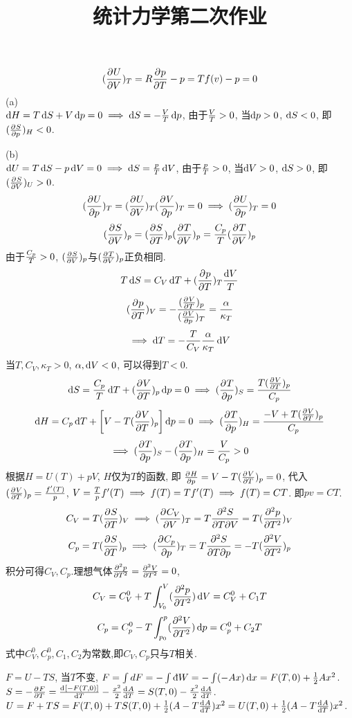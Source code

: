 \documentclass[UTF8,9pt]{ctexart}
\title{统计力学第二次作业}
\begin{document}
 
\maketitle
{}
$$(\pp{U}{V})_T=R\pp{p}{T}-p=Tf(v)-p=0$$
\qqed
{}
    (a)\\
$\d H=T\d S+V\d p=0 \ip \d S=-\f{V}{T}\d p$, 由于$\f{V}{T}>0$, 当$\d p>0$, $\d S<0$, 即$(\pp{S}{p})_H<0$.  

    (b)\\
$\d U =T\d S-p\d V=0 \ip \d S=\f{p}{T}\d V$, 由于$\f{p}{T}>0$, 当$\d V>0$, $\d S>0$, 即$(\pp{S}{V})_U>0$.
\qqed
{}
 $$(\pp{U}{p})_T=(\pp{U}{V})_T(\pp{V}{p})_T=0 \ip (\pp{U}{p})_T=0$$
\qqed
{}
$$(\pp{S}{V})_p=(\pp{S}{T})_p(\pp{T}{V})_p=\f{C_p}{T}(\pp{T}{V})_p$$
由于$\f{C_p}{T}>0$, $(\pp{S}{V})_p$与$(\pp{T}{V})_p$正负相同.
\qqed
{}
$$T\d S = C_V\d T+(\pp{p}{T})_T\f{\d V}{T}$$
$$(\pp{p}{T})_V=-\f{(\pp{V}{T})_p}{(\pp{V}{p})_T} = \f{\a}{\kappa_T}$$
$$\ip \d T= -\f{T}{C_V}\f{\a}{\kappa_T}\d V$$
当$T,C_V,\kappa_T>0$, $\a,\d V<0$, 可以得到$T<0$.
\qqed
{}
$$\d S  =\f{C_p}{T}\d T+(\pp{V}{T})_p\d p=0 \ip (\pp{T}{p})_S=\f{T(\pp{V}{T})_p}{C_p}$$
$$\d H =C_p\d T+\left[V-T(\pp{V}{T})_p\right]\d p=0 \ip (\pp{T}{p})_H=\f{-V+T(\pp{V}{T})_p}{C_p}$$
$$\ip (\pp{T}{p})_S-(\pp{T}{p})_H = \f{V}{C_p}>0$$
\qqed
{}
根据$H=U(T)+pV$, $H$仅为$T$的函数, 即 $\pp{H}{p}=V-T(\pp{V}{T})_p=0 $, 代入$(\pp{V}{T})_p=\f{f'(T)}{p}$, $V=\f{T}{p}f'(T) \ip f(T)=Tf'(T) \ip f(T)=CT$. 即$pv=CT$.
$$C_V=T(\pp{S}{T})_V \ip (\pp{C_V}{V})_T = T\f{\partial^2 S}{\partial T\partial V}=T(\pp[2]{ p}{T})_V$$
$$C_p=T(\pp{S}{T})_p \ip (\pp{C_p}{p})_T=T\f{\partial^2 S}{\partial T\partial p} = -T(\pp[2]{V}{T})_p$$
积分可得$C_V,C_p$.理想气体$\pp[2]{p}{T}=\pp[2]{V}{T}=0$,
$$C_V=C_V^0+T\int_{V_0}^V(\pp[2]{p}{T})\d V=C_V^0 + C_1T$$
$$C_p=C_p^0-T\int_{p_0}^p(\pp[2]{V}{T})\d p=C_p^0+C_2T$$
式中$C_V^0,C_p^0,C_1,C_2$为常数,即$C_V,C_p$只与$T$相关.

\qqed
{}
$F=U-TS$, 当$T$不变, $F=\int dF=-\int \dbar W=-\int (-Ax)\d x=F(T,0)+\ff{2}Ax^2$.\\
$S=-\pp{F}{T}=\dd{[-F(T,0)]}{T}-\f{x^2}{2}\dd{A}{T}=S(T,0)-\f{x^2}{2}\dd{A}{T}$.\\ 
$U=F+TS=F(T,0)+TS(T,0)+\ff{2}(A-T\dd{A}{T})x^2=U(T,0)+\ff{2}(A-T\dd{A}{T})x^2$.

\qqed
\end{document}
